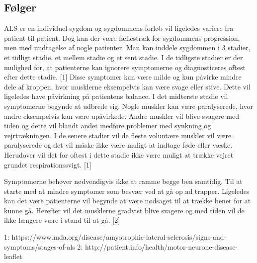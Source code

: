 \subsection{Følger}

ALS er en individuel sygdom og sygdommens forløb vil ligeledes variere fra patient til patient. Dog kan der være fællestræk for sygdommens progression, men med undtagelse af nogle patienter. Man kan inddele sygdommen i 3 stadier, et tidligt stadie, et mellem stadie og et sent stadie. I de tidligste stadier er der mulighed for, at patienterne kan ignorere symptomerne og diagnosticeres oftest efter dette stadie. [1] Disse symptomer kan være milde og kun påvirke mindre dele af kroppen, hvor musklerne eksempelvis kan være svage eller stive. Dette vil ligeledes have påvirkning på patientens balance. I det midterste stadie vil symptomerne begynde at udbrede sig. Nogle muskler kan være paralyserede, hvor andre eksempelvis kan være upåvirkede. Andre muskler vil blive svagere med tiden og dette vil blandt andet medføre problemer med synkning og vejrtrækningen. I de senere stadier vil de fleste voluntære muskler vil være paralyserede og det vil måske ikke være muligt at indtage føde eller væske. Herudover vil det for oftest i dette stadie ikke være muligt at trække vejret grundet respirationssvigt. [1] 

Symptomerne behøver nødvendigvis ikke at ramme begge ben samtidig. Til at starte med at mindre symptomer som besvær ved at gå op ad trapper. Ligeledes kan det være patienterne vil begynde at være nødsaget til at trække benet for at kunne gå. Herefter vil det musklerne gradvist blive svagere og med tiden vil de ikke længere være i stand til at gå. [2]



1: https://www.mda.org/disease/amyotrophic-lateral-sclerosis/signs-and-symptoms/stages-of-als 
2: http://patient.info/health/motor-neurone-disease-leaflet 
